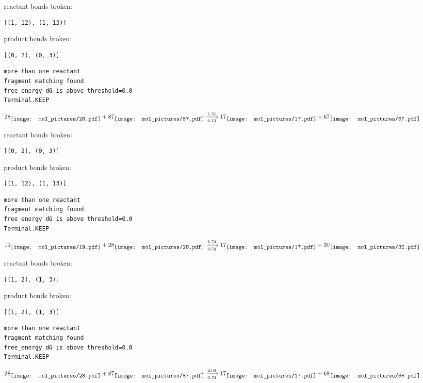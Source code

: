 \documentclass{article}
\begin{document}
reactant bonds broken:\begin{verbatim}
[(1, 12), (1, 13)]
\end{verbatim}
product bonds broken:\begin{verbatim}
[(0, 2), (0, 3)]
\end{verbatim}




\vspace{1cm}
\begin{verbatim}
more than one reactant
fragment matching found
free_energy dG is above threshold=0.0
Terminal.KEEP
\end{verbatim}
$$
28
\raisebox{-.5\height}{\texttt{[image: mol\_pictures/28.pdf]}}
+
87
\raisebox{-.5\height}{\texttt{[image: mol\_pictures/87.pdf]}}
\xrightarrow[0.13]{1.31}
17
\raisebox{-.5\height}{\texttt{[image: mol\_pictures/17.pdf]}}
+
67
\raisebox{-.5\height}{\texttt{[image: mol\_pictures/67.pdf]}}
$$


reactant bonds broken:\begin{verbatim}
[(0, 2), (0, 3)]
\end{verbatim}
product bonds broken:\begin{verbatim}
[(1, 12), (1, 13)]
\end{verbatim}




\vspace{1cm}
\begin{verbatim}
more than one reactant
fragment matching found
free_energy dG is above threshold=0.0
Terminal.KEEP
\end{verbatim}
$$
19
\raisebox{-.5\height}{\texttt{[image: mol\_pictures/19.pdf]}}
+
28
\raisebox{-.5\height}{\texttt{[image: mol\_pictures/28.pdf]}}
\xrightarrow[0.58]{5.79}
17
\raisebox{-.5\height}{\texttt{[image: mol\_pictures/17.pdf]}}
+
30
\raisebox{-.5\height}{\texttt{[image: mol\_pictures/30.pdf]}}
$$


reactant bonds broken:\begin{verbatim}
[(1, 2), (1, 3)]
\end{verbatim}
product bonds broken:\begin{verbatim}
[(1, 2), (1, 3)]
\end{verbatim}




\vspace{1cm}
\begin{verbatim}
more than one reactant
fragment matching found
free_energy dG is above threshold=0.0
Terminal.KEEP
\end{verbatim}
$$
28
\raisebox{-.5\height}{\texttt{[image: mol\_pictures/28.pdf]}}
+
87
\raisebox{-.5\height}{\texttt{[image: mol\_pictures/87.pdf]}}
\xrightarrow[0.20]{2.00}
17
\raisebox{-.5\height}{\texttt{[image: mol\_pictures/17.pdf]}}
+
68
\raisebox{-.5\height}{\texttt{[image: mol\_pictures/68.pdf]}}
$$
\end{document}
